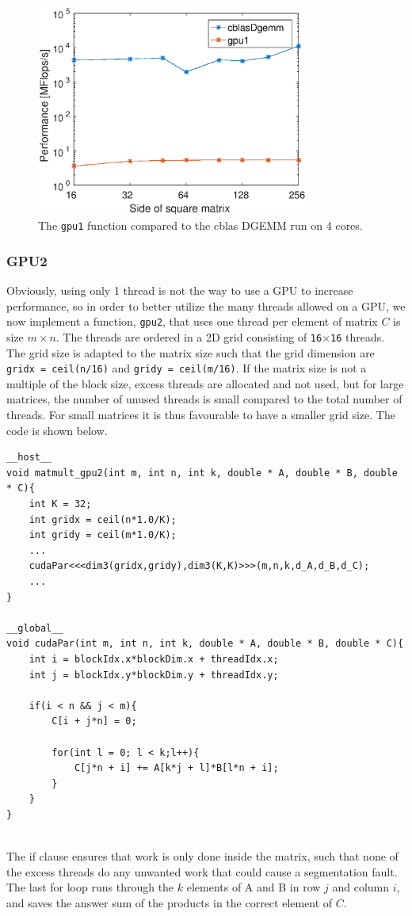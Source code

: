 \begin{figure}
\centering
\includegraphics[width = 0.8\textwidth]{fig/gpu1.eps}
\caption{The \texttt{gpu1} function compared to the cblas DGEMM run on 4 cores.}
\label{fig:gpu1_DGEMM}
\end{figure}

\subsubsection{GPU2}
Obviously, using only 1 thread is not the way to use a GPU to increase performance, so in order to better utilize the many threads allowed on a GPU, we now implement a function, \texttt{gpu2}, that uses one thread per element of matrix $C$ is size $m\times n$. The threads are ordered in a 2D grid consisting of \texttt{16$\times$16} threads. The grid size is adapted to the matrix size such that the grid dimension are \texttt{gridx = ceil(n/16)} and \texttt{gridy = ceil(m/16)}. If the matrix size is not a multiple of the block size, excess threads are allocated and not used, but for large matrices, the number of unused threads is small compared to the total number of threads. For small matrices it is thus favourable to have a smaller grid size. The code is shown below.
\begin{lstlisting}[caption = Code sample of the naive implementation with one thread per element in $C$.]
__host__
void matmult_gpu2(int m, int n, int k, double * A, double * B, double * C){	
	int K = 32;
	int gridx = ceil(n*1.0/K);
	int gridy = ceil(m*1.0/K);
	...
	cudaPar<<<dim3(gridx,gridy),dim3(K,K)>>>(m,n,k,d_A,d_B,d_C);
	...
}

__global__
void cudaPar(int m, int n, int k, double * A, double * B, double * C){
	int i = blockIdx.x*blockDim.x + threadIdx.x;
	int j = blockIdx.y*blockDim.y + threadIdx.y;

	if(i < n && j < m){
		C[i + j*n] = 0;

		for(int l = 0; l < k;l++){
			C[j*n + i] += A[k*j + l]*B[l*n + i];
		}
	}
}
	
\end{lstlisting}
The if clause ensures that work is only done inside the matrix, such that none of the excess threads do any unwanted work that could cause a segmentation fault. The last for loop runs through the $k$ elements of A and B in row $j$ and column $i$, and saves the answer sum of the products in the correct element of $C$.


